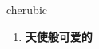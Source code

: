 
\begin{frame}
{\huge cherubic}
\begin{center}
\begin{enumerate}\Large
  \item \textbf{天使般可爱的}
\end{enumerate}
\end{center}
\end{frame}
